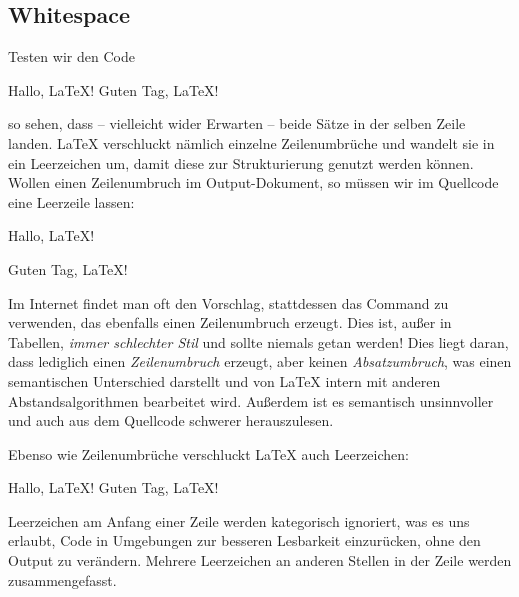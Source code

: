 \subsection{Whitespace}
Testen wir den Code
\begin{latexlisting}
	Hallo, LaTeX!
	Guten Tag, LaTeX!
\end{latexlisting}
so sehen, dass -- vielleicht wider Erwarten -- beide Sätze in der selben Zeile landen.
\LaTeX{} verschluckt nämlich einzelne Zeilenumbrüche und wandelt sie in ein Leerzeichen um, damit diese zur Strukturierung genutzt werden können.
Wollen einen Zeilenumbruch im Output-Dokument, so müssen wir im Quellcode eine Leerzeile lassen:
\begin{latexlisting}
	Hallo, LaTeX!

	Guten Tag, LaTeX!
\end{latexlisting}
Im Internet findet man oft den Vorschlag, stattdessen das Command \latexcommand{\textbackslash} zu verwenden, das ebenfalls einen Zeilenumbruch erzeugt.
Dies ist, außer in Tabellen, \emph{immer schlechter Stil} und sollte niemals getan werden!
Dies liegt daran, dass \latexcommand{\textbackslash} lediglich einen \emph{Zeilenumbruch} erzeugt, aber keinen \emph{Absatzumbruch}, was einen semantischen Unterschied darstellt und von \LaTeX{} intern mit anderen Abstandsalgorithmen bearbeitet wird.
Außerdem ist es semantisch unsinnvoller und auch aus dem Quellcode schwerer herauszulesen.

Ebenso wie Zeilenumbrüche verschluckt \LaTeX{} auch Leerzeichen:
\begin{latexlisting}
	Hallo, LaTeX!           Guten Tag, LaTeX!
\end{latexlisting}
Leerzeichen am Anfang einer Zeile werden kategorisch ignoriert, was es uns erlaubt, Code in Umgebungen zur besseren Lesbarkeit einzurücken, ohne den Output zu verändern.
Mehrere Leerzeichen an anderen Stellen in der Zeile werden zusammengefasst.

